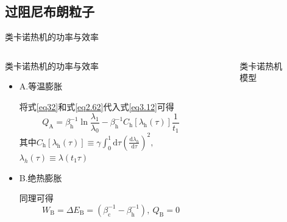 \documentclass{beamer}
\newcommand{\DD}[2]{\frac{\mathrm{d} #1}{\mathrm{d} #2}}
\begin{document}
\subsection{过阻尼布朗粒子}
\begin{frame}{类卡诺热机的功率与效率}
    \begin{columns}
        \begin{column}{.7\textwidth}
            \begin{block}{类卡诺热机的功率与效率}
            \begin{itemize}
            \item<2-> A.等温膨胀

            将式\eqref{eq32}和式\eqref{eq2.62}代入式\eqref{eq3.12}可得
            \begin{equation}
                Q_{\mathrm{A}} = \beta_{\mathrm{h}}^{-1} \ln{\frac{\lambda_1}{\lambda_0}} - \beta_{\mathrm{h}}^{-1} C_{\mathrm{h}} [\lambda_{\mathrm{h}}(\tau)] \frac{1}{t_1}     
                \label{eq3.16}
            \end{equation}
            其中$C_{\mathrm{h}} [\lambda_{\mathrm{h}}(\tau)] \equiv \gamma \int_{0}^{1} \mathrm{d} \tau \left(\DD{\lambda_{h}}{\tau}\right)^2,$ $\lambda_{h}(\tau)\equiv\lambda({t_1 \tau})$
            \item<3-> B.绝热膨胀
            
            同理可得
            \begin{equation}
                W_{\mathrm{B}} = \Delta E_{\mathrm{B}} = (\beta_{\mathrm{c}}^{-1} - \beta_{\mathrm{h}}^{-1}),\  Q_{\mathrm{B}}=0
                \label{eq3.17}
            \end{equation}
            \end{itemize}
            \end{block}          
        \end{column}
        \begin{column}{.4\textwidth}
        \begin{figure}
            \centering
            \def\svgwidth{\columnwidth}
            
            \setcounter{figure}{2}
            \caption{类卡诺热机模型}
            \end{figure}
        \end{column}   
    \end{columns}
\end{frame}
\end{document}

